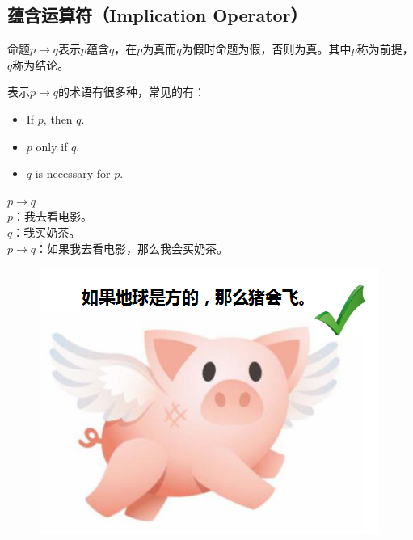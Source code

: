 \vspace{0.5cm}

\subsection{蕴含运算符（Implication Operator）}

命题$ p \rightarrow q $表示$ p $蕴含$ q $，在$ p $为真而$ q $为假时命题为假，否则为真。其中$ p $称为前提，$ q $称为结论。

\begin{table}[H]
	\centering
	\caption{蕴含真值表}
\end{table}

表示$ p \rightarrow q $的术语有很多种，常见的有：

\begin{itemize}
	\item If $ p $, then $ q $.
	\item $ p $ only if $ q $.
	\item $ q $ is necessary for $ p $.
\end{itemize}

\begin{tcolorbox}
	$ p \rightarrow q $\\
	$ p $：我去看电影。\\
	$ q $：我买奶茶。\\
	$ p \rightarrow q $：如果我去看电影，那么我会买奶茶。
\end{tcolorbox}

\begin{figure}[H]
	\centering
	\includegraphics[scale=0.7]{img/C1/1-2/1.png}
\end{figure}

